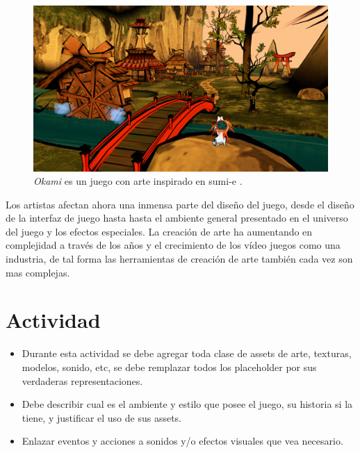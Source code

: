 \begin{figure}
\includegraphics[width=\linewidth]{media/okamips2.jpg}
\caption{\emph{Okami} \cite{okami} es un juego con arte inspirado en sumi-e \cite{sumie}.}
\label{fig:particles}
\end{figure}
Los artistas afectan ahora una inmensa parte del diseño del juego, desde el diseño de la interfaz de juego hasta hasta el ambiente general presentado en el universo del juego y los efectos especiales. La creación de arte ha aumentando en complejidad a través de los años y el crecimiento de los vídeo juegos como una industria, de tal forma las herramientas de creación de arte también cada vez son mas complejas.
\section{Actividad}
\begin{itemize}
\item Durante esta actividad se debe agregar toda clase de assets de arte, texturas, modelos, sonido, etc, se debe remplazar todos los placeholder por sus verdaderas representaciones.
\item Debe describir cual es el ambiente y estilo que posee el juego, su historia si la tiene, y justificar el uso de sus assets.
\item Enlazar eventos y acciones a sonidos y/o efectos visuales que vea necesario.
\end{itemize}
